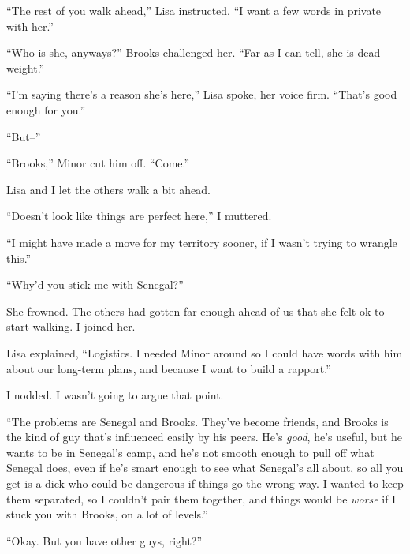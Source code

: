 ``The rest of you walk ahead,'' Lisa instructed, ``I want a few words in private with her.''



``Who is she, anyways?'' Brooks challenged her.  ``Far as I can tell, she is dead weight.''



``I'm saying there's a reason she's here,'' Lisa spoke, her voice firm.  ``That's good enough for you.''



``But--''



``Brooks,'' Minor cut him off.  ``Come.''



Lisa and I let the others walk a bit ahead.



``Doesn't look like things are perfect here,'' I muttered.



``I might have made a move for my territory sooner, if I wasn't trying to wrangle this.''



``Why'd you stick me with Senegal?''



She frowned.  The others had gotten far enough ahead of us that she felt ok to start walking.  I joined her.



Lisa explained, ``Logistics.  I needed Minor around so I could have words with him about our long-term plans, and because I want to build a rapport.''



I nodded.  I wasn't going to argue that point.



``The problems are Senegal and Brooks.  They've become friends, and Brooks is the kind of guy that's influenced easily by his peers.  He's \emph{good}, he's useful, but he wants to be in Senegal's camp, and he's not smooth enough to pull off what Senegal does, even if he's smart enough to see what Senegal's all about, so all you get is a dick who could be dangerous if things go the wrong way.  I wanted to keep them separated, so I couldn't pair them together, and things would be \emph{worse} if I stuck you with Brooks, on a lot of levels.''



``Okay.  But you have other guys, right?''



